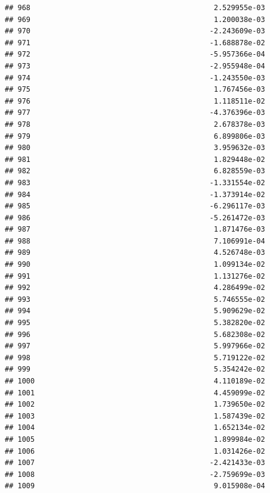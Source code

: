 \documentclass[
]{article}
\begin{document}
\begin{verbatim}
## 968                                           2.529955e-03
## 969                                           1.200038e-03
## 970                                          -2.243609e-03
## 971                                          -1.688878e-02
## 972                                          -5.957366e-04
## 973                                          -2.955948e-04
## 974                                          -1.243550e-03
## 975                                           1.767456e-03
## 976                                           1.118511e-02
## 977                                          -4.376396e-03
## 978                                           2.678378e-03
## 979                                           6.899806e-03
## 980                                           3.959632e-03
## 981                                           1.829448e-02
## 982                                           6.828559e-03
## 983                                          -1.331554e-02
## 984                                          -1.373914e-02
## 985                                          -6.296117e-03
## 986                                          -5.261472e-03
## 987                                           1.871476e-03
## 988                                           7.106991e-04
## 989                                           4.526748e-03
## 990                                           1.099134e-02
## 991                                           1.131276e-02
## 992                                           4.286499e-02
## 993                                           5.746555e-02
## 994                                           5.909629e-02
## 995                                           5.382820e-02
## 996                                           5.682308e-02
## 997                                           5.997966e-02
## 998                                           5.719122e-02
## 999                                           5.354242e-02
## 1000                                          4.110189e-02
## 1001                                          4.459099e-02
## 1002                                          1.739650e-02
## 1003                                          1.587439e-02
## 1004                                          1.652134e-02
## 1005                                          1.899984e-02
## 1006                                          1.031426e-02
## 1007                                         -2.421433e-03
## 1008                                         -2.759699e-03
## 1009                                          9.015908e-04

\end{verbatim}
\end{document}

